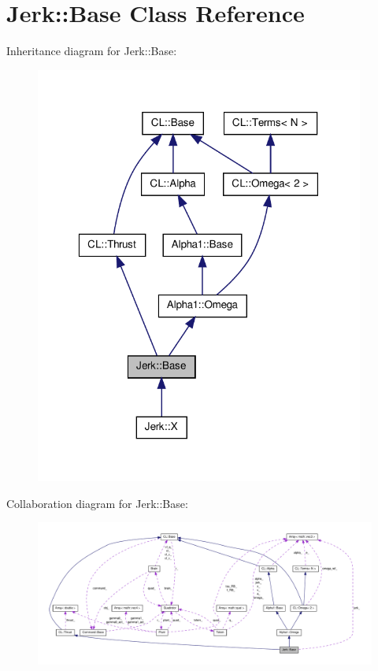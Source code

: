 \hypertarget{classJerk_1_1Base}{\section{\-Jerk\-:\-:\-Base \-Class \-Reference}
\label{classJerk_1_1Base}
}


\-Inheritance diagram for \-Jerk\-:\-:\-Base\-:\nopagebreak
\begin{figure}[H]
\begin{center}
\leavevmode
\includegraphics[width=307pt]{classJerk_1_1Base__inherit__graph}
\end{center}
\end{figure}


\-Collaboration diagram for \-Jerk\-:\-:\-Base\-:\nopagebreak
\begin{figure}[H]
\begin{center}
\leavevmode
\includegraphics[width=350pt]{classJerk_1_1Base__coll__graph}
\end{center}
\end{figure}
